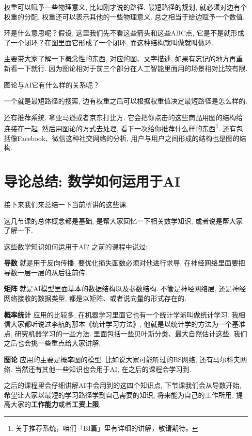 权重可以赋予一些物理意义, 比如刚才说的路径. 最短路径的规划, 就必须对边有个权重的分配. 权重还可以表示其他的一些物理意义. 总之相当于给边赋予一个数值. 

环是什么意思呢？假设, 这里我们先不看这些箭头和这些ABC点, 它是不是就形成了一个闭环？在图里面它形成了一个闭环, 而这种结构就叫做就叫做环. 

主要带大家了解一下概念性的东西, 对应的图、文字描述, 如果有忘记的地方再重新看一下就行. 因为图论相对于前三个部分在人工智能里面用的场景相对比较有限. 

图论与AI它有什么样的关系呢？

一个就是最短路径的搜索, 边有权重之后可以根据权重值决定最短路径是怎么样的. 

还有推荐系统, 拿亚马逊或者京东打比方. 它会把你点击的这些商品用图的结构给连接在一起, 然后用图论的方式去处理, 看下一次给你推荐什么样的东西\footnote{关于推荐系统，咱们「BI篇」里有详细的讲解，敬请期待。}. 还有包括像Facebook、微信这种社交网络的分析, 用户与用户之间形成的结构也是图的结构. 

\hypertarget{数学如何运用于AI}{}
\section{导论总结: 数学如何运用于AI}

接下来我们来总结一下当前所讲的这些课. 

这几节课的总体概念都是基础, 是帮大家回忆一下相关数学知识, 或者说是帮大家了解一下. 

这些数学知识如何运用于AI? 之前的课程中说过: 

\textbf{导数} 就是用于反向传播. 要优化损失函数必须对他进行求导, 在神经网络里面要把导数一层一层的从后往前传. 

\textbf{矩阵} 就是AI模型里面基本的数据结构以及参数结构. 不管是神经网络层, 还是神经网络接收的数据类型, 都是以矩阵、或者说向量的形式存在的. 

\textbf{概率统计} 应用的比较多, 在机器学习里面它也有一个统计学派叫做统计学习. 我相信大家都听说过李航的那本《统计学习方法》, 他就是以统计学的方法为一个基准点, 研究机器学习的一些方法. 里面包括一些贝叶斯分类、最大自然估计这些. 我们之后也会挑一些重点给大家讲解. 

\textbf{图论} 应用的主要是概率图的模型. 比如说大家可能听过的BS网络, 还有马尔科夫网络. 当然还有其他一些知识也会用于AI, 在之后的课程会学习到. 

之后的课程里会仔细讲解AI中会用到的这四个知识点, 下节课我们会从导数开始, 希望让大家以最短的学习路径学到自己需要的知识, 将来能为自己的工作所用, 提高大家的\textbf{工作能力}或者\textbf{工资上限}. 
